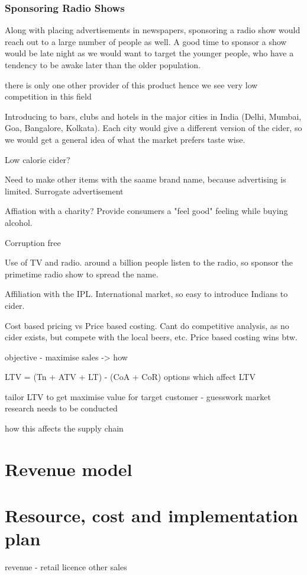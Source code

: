 \documentclass{article}
\begin{document}
\subsubsection{Sponsoring Radio Shows}
Along with placing advertisements in newspapers, sponsoring a radio show would reach
out to a large number of people as well. A good time to sponsor a show would be
late night as we would want to target the younger people, who have a tendency to
be awake later than the older population.
\newpage

there is only one other provider of this product hence we see very low competition in this field

Introducing to bars, clubs and hotels in the major cities in India (Delhi, Mumbai, Goa,
Bangalore, Kolkata). Each city would give a different version of the cider, so we would
get a general idea of what the market prefers taste wise.

Low calorie cider?

Need to make other items with the saame brand name, because advertising is limited. Surrogate advertisement

Affiation with a charity? Provide consumers a "feel good" feeling while buying alcohol.

Corruption free

Use of TV and radio. around a billion people listen to the radio, so sponsor the primetime radio
show to spread the name.

Affiliation with the IPL. International market, so easy to introduce Indians to cider.

Cost based pricing vs Price based costing. Cant do competitive analysis, as no cider exists, but compete with
the local beers, etc. Price based costing wins btw.



objective - maximise sales -> how

LTV = (Tn + ATV + LT) - (CoA + CoR)
options which affect LTV

tailor LTV to get maximise value for target customer - guesswork market research
needs to be conducted

how this affects the supply chain
\section{Revenue model}
\section{Resource, cost and implementation plan}
revenue
 - retail
   licence
   other sales
\end{document}
